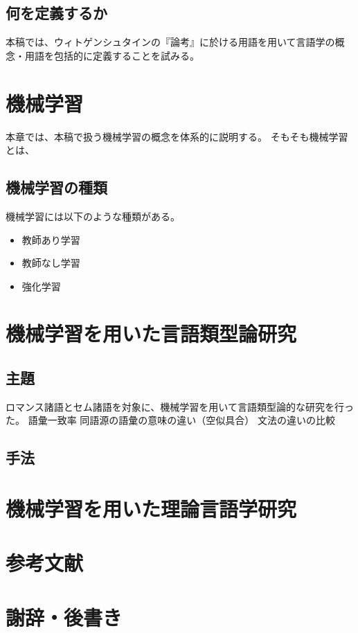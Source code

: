 \documentclass[12pt, oneside]{book}
\begin{document}
\chapter{何を定義するか}
本稿では、ウィトゲンシュタインの『論考』に於ける用語を用いて言語学の概念・用語を包括的に定義することを試みる。
\chapter{}
\part{機械学習}
本章では、本稿で扱う機械学習の概念を体系的に説明する。
そもそも機械学習とは、
\chapter{機械学習の種類}
機械学習には以下のような種類がある。
\begin{itemize}
    \item 教師あり学習
    \item 教師なし学習
    \item 強化学習
\end{itemize}
\part{機械学習を用いた言語類型論研究}
\chapter{主題}
ロマンス諸語とセム諸語を対象に、機械学習を用いて言語類型論的な研究を行った。
語彙一致率
同語源の語彙の意味の違い（空似具合）
文法の違いの比較
\chapter{手法}

\part{機械学習を用いた理論言語学研究}
\part{参考文献}
\part{謝辞・後書き}
\end{document}
